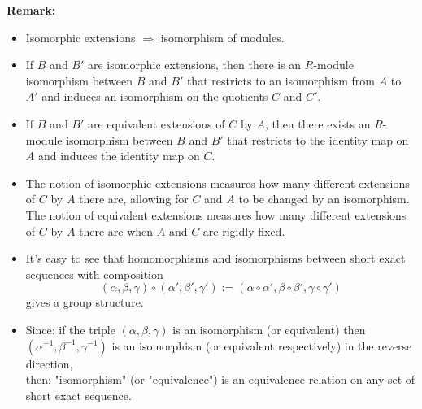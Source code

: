 \noindent\textbf{Remark:} \begin{itemize}
    \item Isomorphic extensions $\Rightarrow$ isomorphism of modules.
    \item If $B$ and $B'$ are isomorphic extensions, then there is an $R$-module isomorphism between $B$ and $B'$ that restricts to an isomorphism from $A$ to $A'$ and induces an isomorphism on the quotients $C$ and $C'$.

    \item If $B$ and $B'$ are equivalent extensions of $C$ by $A$, then there exists an $R$-module isomorphism between $B$ and $B'$ that restricts to the identity map on $A$ and induces the identity map on $C$.

    \item The notion of isomorphic extensions measures how many different extensions of $C$ by $A$ there are, allowing for $C$ and $A$ to be changed by an isomorphism. The notion of equivalent extensions measures how many different extensions of $C$ by $A$ there are when $A$ and $C$ are rigidly fixed.

    \item It's easy to see that homomorphisms and isomorphisms between short exact sequences with composition
    $$(\alpha,\beta,\gamma) \circ (\alpha' ,\beta', \gamma') := (\alpha \circ \alpha' ,\beta \circ \beta', \gamma \circ \gamma')$$
    gives a group structure.

    \item Since: if the triple $(\alpha ,\beta ,\gamma)$ is an isomorphism (or equivalent) then $(\alpha^{-1} ,\beta^{-1} ,\gamma^{-1})$ is an isomorphism (or equivalent respectively) in the reverse direction,\\
    then: "isomorphism" (or "equivalence") is an equivalence relation on any set of short exact sequence.
\end{itemize}

